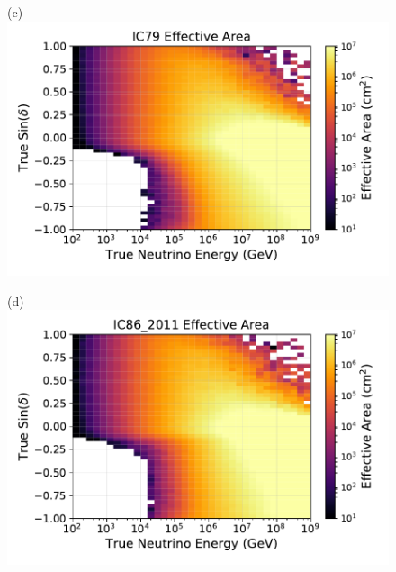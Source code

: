\documentclass[aps,10pt,prd,twocolumn,floats,letterpaper,showpacs,nofootinbib,bibnotes,notitlepage,superscriptaddress,floatfix]{revtex4-1}
\begin{document}
\begin{figure}[t]
\begin{minipage}[c][6.5cm][c]{0.49\textwidth}
{(c)}\\\includegraphics[width=\linewidth]{./PublicReleasePlots/EffectiveAreaPlots/IC79_effectiveArea.pdf}
\end{minipage}
\begin{minipage}[c][6.5cm][c]{0.49\textwidth}\centering
{(d)}\\\includegraphics[width=\linewidth]{./PublicReleasePlots/EffectiveAreaPlots/IC86_2011_effectiveArea.pdf}
\end{minipage}\\
\begin{minipage}[c][6.5cm][c]{0.49\textwidth}\centering

\end{minipage}
\end{figure}
\end{document}

